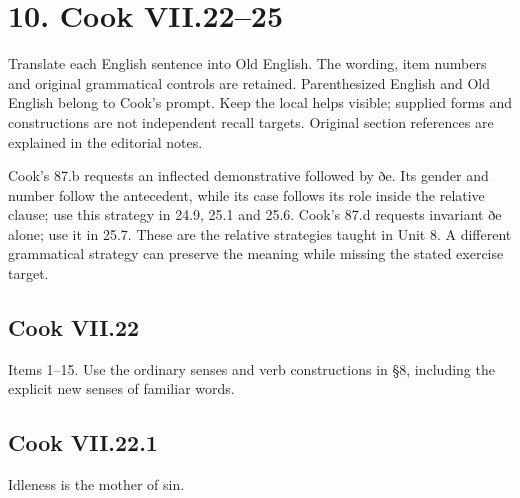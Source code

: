\section*{10. Cook VII.22–25}

Translate each English sentence into Old English. The wording, item numbers and original grammatical controls are retained. Parenthesized English and Old English belong to Cook’s prompt. Keep the local helps visible; supplied forms and constructions are not independent recall targets. Original section references are explained in the editorial notes.

Cook’s 87.b requests an inflected demonstrative followed by ðe. Its gender and number follow the antecedent, while its case follows its role inside the relative clause; use this strategy in 24.9, 25.1 and 25.6. Cook’s 87.d requests invariant ðe alone; use it in 25.7. These are the relative strategies taught in Unit 8. A different grammatical strategy can preserve the meaning while missing the stated exercise target.

\subsection*{Cook VII.22}

Items 1–15. Use the ordinary senses and verb constructions in §8, including the explicit new senses of familiar words.

\par\begin{minipage}{\linewidth}\raggedright
\subsection*{Cook VII.22.1}

Idleness is the mother of sin.

\end{minipage}\par\addvspace{4pt}

